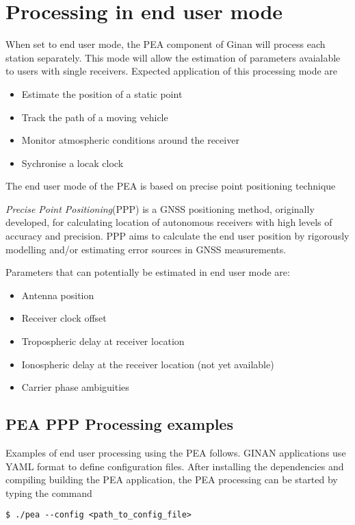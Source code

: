 \chapter{Processing in end user mode}
When set to end user mode, the PEA component of Ginan will process each station separately. This mode will allow the estimation of parameters avaialable to users with single receivers. Expected application of this processing mode are
\begin{itemize}
	\item Estimate the position of a static point
	\item Track the path of a moving vehicle
	\item Monitor atmospheric conditions around the receiver
	\item Sychronise a locak clock
\end{itemize}
The end user  mode of the PEA is based on precise point positioning technique

\textit{Precise Point Positioning}(PPP) is a GNSS positioning method, originally developed, for calculating location of autonomous receivers with high levels of accuracy and precision. PPP aims to calculate the end user position by rigorously modelling and/or estimating error sources in GNSS measurements. 


Parameters that can potentially be estimated in end user mode are:
\begin{itemize}
	\item Antenna position
	\item Receiver clock offset
	\item Tropospheric delay at receiver location
	\item Ionospheric delay at the receiver location (not yet available)
	\item Carrier phase ambiguities
\end{itemize}

\section{PEA PPP Processing examples}
Examples of end user processing using the PEA follows. GINAN applications use YAML format to define configuration files. After installing the dependencies and compiling building the PEA application, the PEA processing can be started by typing the command 
\begin{verbatim}
$ ./pea --config <path_to_config_file>
\end{verbatim}

